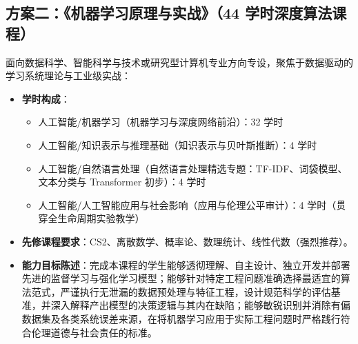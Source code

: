 \subsection{方案二：《机器学习原理与实战》（44 学时深度算法课程）}
面向数据科学、智能科学与技术或研究型计算机专业方向专设，聚焦于数据驱动的学习系统理论与工业级实战：
\begin{itemize}
    \item \textbf{学时构成}：
    \begin{itemize}
        \item 人工智能/机器学习（机器学习与深度网络前沿）：32 学时
        \item 人工智能/知识表示与推理基础（知识表示与贝叶斯推断）：4 学时
        \item 人工智能/自然语言处理（自然语言处理精选专题：TF-IDF、词袋模型、文本分类与 Transformer 初步）：4 学时
        \item 人工智能/人工智能应用与社会影响（应用与伦理公平审计）：4 学时（贯穿全生命周期实验教学）
    \end{itemize}
    \item \textbf{先修课程要求}：CS2、离散数学、概率论、数理统计、线性代数（强烈推荐）。
    \item \textbf{能力目标陈述}：完成本课程的学生能够透彻理解、自主设计、独立开发并部署先进的监督学习与强化学习模型；能够针对特定工程问题准确选择最适宜的算法范式，严谨执行无泄漏的数据预处理与特征工程，设计规范科学的评估基准，并深入解释产出模型的决策逻辑与其内在缺陷；能够敏锐识别并消除有偏数据集及各类系统误差来源，在将机器学习应用于实际工程问题时严格践行符合伦理道德与社会责任的标准。
\end{itemize}

